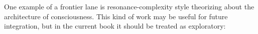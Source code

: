 One example of a frontier lane is resonance-complexity style theorizing about
the architecture of consciousness. This kind of work may be useful for future
integration, but in the current book it should be treated as exploratory:
